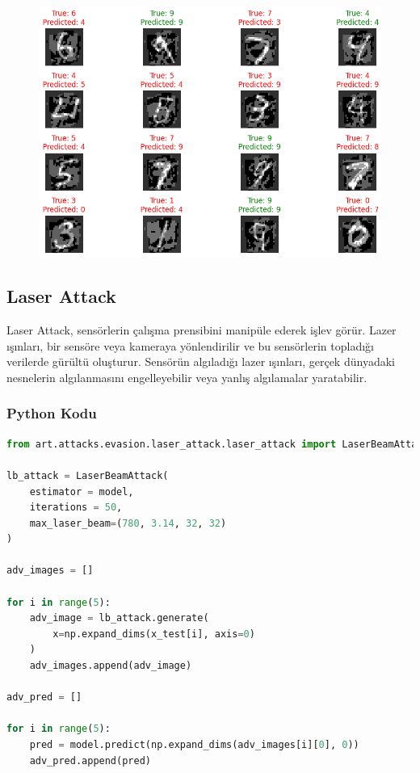 \begin{figure}[h]
    \centering
    \includegraphics[width=1\textwidth]{images/pgd_attack_results.png}
    \caption{}
\end{figure}

\newpage

\subsection{Laser Attack}

Laser Attack, sensörlerin çalışma prensibini manipüle ederek işlev görür. Lazer ışınları, bir sensöre veya kameraya yönlendirilir ve bu sensörlerin topladığı verilerde gürültü oluşturur. Sensörün algıladığı lazer ışınları, gerçek dünyadaki nesnelerin algılanmasını engelleyebilir veya yanlış algılamalar yaratabilir.

\subsubsection{Python Kodu}

\begin{lstlisting}[language=Python]
from art.attacks.evasion.laser_attack.laser_attack import LaserBeamAttack

lb_attack = LaserBeamAttack(
    estimator = model,
    iterations = 50,
    max_laser_beam=(780, 3.14, 32, 32)
)

adv_images = []

for i in range(5):
    adv_image = lb_attack.generate(
        x=np.expand_dims(x_test[i], axis=0)
    )
    adv_images.append(adv_image)

adv_pred = []

for i in range(5):
    pred = model.predict(np.expand_dims(adv_images[i][0], 0))
    adv_pred.append(pred)
\end{lstlisting}

